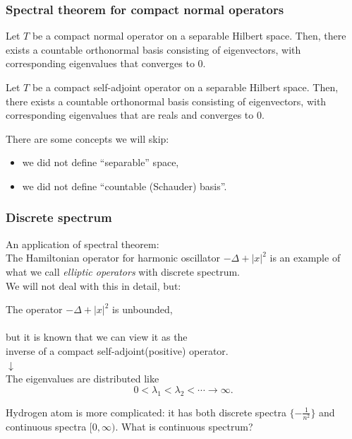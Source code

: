 \documentclass[10pt,handout]{beamer}
\begin{document}
\begin{frame}
\frametitle{Spectral theorem for compact normal operators}
  \begin{thm}
    Let $T$ be a compact normal operator on a separable Hilbert space. Then, there exists a countable orthonormal basis consisting of eigenvectors, with corresponding eigenvalues that converges to 0.
  \end{thm}
  \begin{thm}
    Let $T$ be a compact self-adjoint operator on a separable Hilbert space. Then, there exists a countable orthonormal basis consisting of eigenvectors, with corresponding eigenvalues that are reals and converges to 0.
  \end{thm}
  \pause
  \begin{rmk}
    There are some concepts we will skip:
    \begin{itemize}
      \item we did not define ``separable'' space,
      \item we did not define ``countable (Schauder) basis''.
    \end{itemize}
  \end{rmk}
\end{frame}

\begin{frame}
\frametitle{Discrete spectrum}
  An application of spectral theorem:\\
  The Hamiltonian operator for harmonic oscillator $-\Delta+|x|^2$ is an example of what we call \emph{elliptic operators} with discrete spectrum.\\
  We will not deal with this in detail, but:
  \bigskip
  \begin{center}
    \pause The operator $-\Delta+|x|^2$ is unbounded,\\$\ $\\
    \pause but it is known that we can view it as the\\
    inverse of a compact self-adjoint(positive) operator.\\
    \pause $\downarrow$ \\
    The eigenvalues are distributed like
    \[0<\lambda_1<\lambda_2<\cdots\to\infty.\]
  \end{center}
  \pause Hydrogen atom is more complicated: it has both discrete spectra $\{-\frac1{n^2}\}$ and continuous spectra $[0,\infty)$.
  What is continuous spectrum?
\end{frame}
\end{document}

